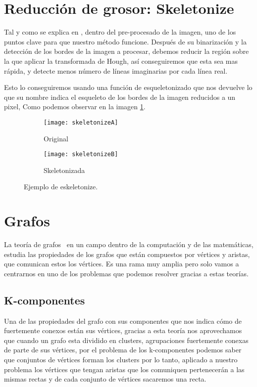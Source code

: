 \section{Reducción de grosor: Skeletonize}
Tal y como se explica en \cite{scik:skeleton}, dentro del pre-procesado de la imagen, uno de los puntos clave para que nuestro método funcione.
Después de su binarización y la detección de los bordes de la imagen a procesar, debemos reducir la región sobre la que aplicar la transformada de Hough, así conseguiremos que esta sea mas rápida, y detecte menos número de líneas imaginarias por cada línea real.

Esto lo conseguiremos usando una función de esqueletonizado que nos devuelve lo que su nombre indica el esqueleto de los bordes de la imagen reducidos a un pixel, Como podemos observar en la imagen \ref{fig:3.6}.


\begin{figure}
\begin{subfigure}[b]{.5\linewidth}
\centering\large \texttt{[image: skeletonizeA]}
\caption{Original}
\end{subfigure}%
\begin{subfigure}[b]{.5\linewidth}
\centering\large \texttt{[image: skeletonizeB]}
\caption{Skeletonizada}
\end{subfigure}
\caption{Ejemplo de eskeletonize.}\label{fig:3.6}
\end{figure}


\section{Grafos}	
La teoría de grafos~\cite{Wiki:Grafos} en un campo dentro de la computación y de las matemáticas, estudia las propiedades de los grafos que están compuestos por vértices y aristas, que comunican estos los vértices.
Es una rama muy amplia pero solo vamos a centrarnos en uno de los problemas que podemos resolver gracias a estas teorías.

\subsection{K-componentes}
Una de las propiedades del grafo con sus componentes que nos indica cómo de fuertemente conexos están sus vértices, gracias a esta teoría nos aprovechamos que cuando un grafo esta dividido en clusters, agrupaciones fuertemente conexas de parte de sus vértices, por el problema de los k-componentes podemos saber que conjuntos de vértices forman los clusters por lo tanto, aplicado a nuestro problema los vértices que tengan aristas que los comuniquen pertenecerán a las mismas rectas y de cada conjunto de vértices sacaremos una recta.

